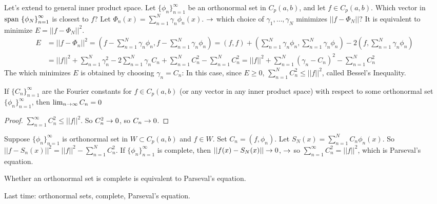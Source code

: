 \documentclass[]{article}
\begin{document}
Let's extend to general inner product space. Let $\{\phi_n\}_{n=1}^\infty$ be an orthonormal set in $C_p(a,b)$, and let $f\in C_p(a,b)$. Which vector in $\text{span}\,\left\{ \phi_N \right\}_{n=1}^\infty$ is closest to $f$?
Let $\Phi_n (x) = \sum_{n=1}^N \gamma_n \phi_n(x)$. $\rightarrow$ which choice of $\gamma_1,\dots,\gamma_N$ minimizes $||f-\Phi_N||?$ It is equivalent to minimize $E = ||f-\Phi_N||^2$.
\begin{align*}
E &= ||f-\Phi_n||^2 = \left(f - \sum_{n=1}^N \gamma_n \phi_n, f-\sum_{n=1}^N \gamma_n \phi_n \right) = (f,f) + \left(\sum_{n=1}^N \gamma_n \phi_n, \sum_{n=1}^N \gamma_n \phi_n \right) - 2\left( f, \sum_{n=1}^N \gamma_n \phi_n \right) \\
&= ||f||^2 + \sum_{n=1}^N \gamma_n^2 - 2\sum_{n=1}^N \gamma_n C_n + \sum_{n=1}^N C_n^2 - \sum_{n=1}^N C_n^2 = ||f||^2 + \sum_{n=1}^N(\gamma_n - C_n)^2 - \sum_{n=1}^N C_n^2
\end{align*}
The  which minimizes $E$ is obtained by choosing $\gamma_n = C_n$: In this case, since $E\geq 0$, $\sum_{n=1}^N C_n^2 \leq ||f||^2$, called Bessel's Inequality.
\begin{theorem}
	If $\{C_n\}_{n=1}^\infty$ are the Fourier constants for $f\in C_p(a,b)$ (or any vector in any inner product space) with respect to some orthonormal set $\{\phi_n\}_{n=1}^\infty$, then $\lim_{n\rightarrow\infty} C_n = 0$
\end{theorem}
\begin{proof}
	$\sum_{n=1}^\infty C_n^2 \leq ||f||^2$. So $C_n^2\rightarrow 0$, so $C_n\rightarrow 0$.
\end{proof}
Suppose $\{\phi_n\}_{n=1}^\infty$ is orthonormal set in $W\subset C_p(a,b)$ and $f\in W$. Set $C_n = (f,\phi_n)$. Let $S_N(x) = \sum_{n=1}^N C_n\phi_n(x)$. So $||f-S_n(x)||^2 = ||f||^2 - \sum_{n=1}^N C_n^2$. If $\{\phi_n\}_{n=1}^\infty$ is complete, then $||f(x)-S_N(x)|| \rightarrow 0$, $\rightarrow$ so $\sum_{n=1}^\infty C_n^2 = ||f||^2$, which is Parseval's equation.
\begin{remark}
	Whether an orthonormal set is complete is equivalent to Parseval's equation.
\end{remark}

Last time: orthonormal sets, complete, Parseval's equation.
\end{document}
